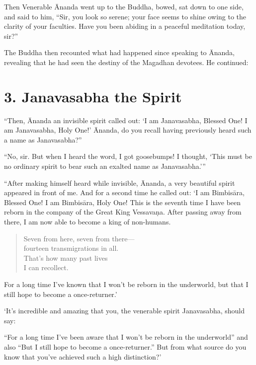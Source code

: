 \documentclass[12pt,openany]{book}%
\begin{document}
Then Venerable Ānanda went up to the Buddha, bowed, sat down to one side, and said to him, “Sir, you look so serene; your face seems to shine owing to the clarity of your faculties. Have you been abiding in a peaceful meditation today, sir?” 

The Buddha then recounted what had happened since speaking to Ānanda, revealing that he had seen the destiny of the Magadhan devotees. He continued: 

\section*{3. Janavasabha the Spirit }

“Then, Ānanda an invisible spirit called out: ‘I am Janavasabha, Blessed One! I am Janavasabha, Holy One!’ Ānanda, do you recall having previously heard such a name as Janavasabha?” 

“No, sir. But when I heard the word, I got goosebumps! I thought, ‘This must be no ordinary spirit to bear such an exalted name as Janavasabha.’” 

“After making himself heard while invisible, Ānanda, a very beautiful spirit appeared in front of me. And for a second time he called out: ‘I am \textsanskrit{Bimbisāra}, Blessed One! I am \textsanskrit{Bimbisāra}, Holy One! This is the seventh time I have been reborn in the company of the Great King \textsanskrit{Vessavaṇa}. After passing away from there, I am now able to become a king of non-humans. 

\begin{verse}%
Seven from here, seven from there—\\
fourteen transmigrations in all. \\
That’s how many past lives \\
I can recollect. 

%
\end{verse}

For a long time I’ve known that I won’t be reborn in the underworld, but that I still hope to become a once-returner.’ 

‘It’s incredible and amazing that you, the venerable spirit Janavasabha, should say: 

“For a long time I’ve been aware that I won’t be reborn in the underworld” and also “But I still hope to become a once-returner.” But from what source do you know that you’ve achieved such a high distinction?’ 
\end{document}
